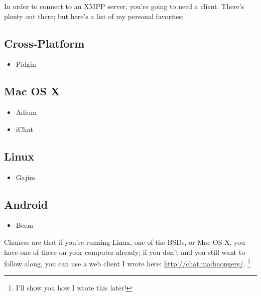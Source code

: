 \newpage

In order to connect to an XMPP server, you're going to need a client.  There's plenty out there;
but here's a list of my personal favorites:

\pause
\subsection*{Cross-Platform}

\begin{itemize}
\item Pidgin
\end{itemize}

\pause
\subsection*{Mac OS X}

\begin{itemize}
\item Adium
\item iChat
\end{itemize}

\pause
\subsection*{Linux}

\begin{itemize}
\item Gajim
\end{itemize}

\pause
\subsection*{Android}

\begin{itemize}
\item Beem
\end{itemize}

\newpage
Chances are that if you're running Linux, one of the BSDs, or Mac OS X, you have one of these on your computer already;
if you don't and you still want to follow along, you can use a web client I wrote here: \url{http://chat.madmongers/}.
\footnote{I'll show you how I wrote this later!}
